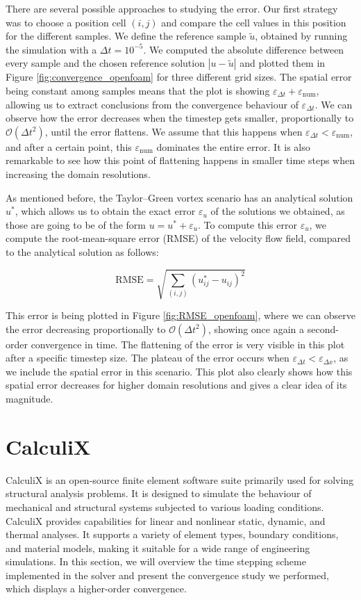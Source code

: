 \documentclass[
  english,        %
  font=times,     %
  onecolumn,      %
]{tumarticle}
\begin{document}
There are several possible approaches to studying the error. Our first strategy was to choose a position cell $(i,j)$ and compare the cell values in this position for the different samples. We define the reference sample $\tilde{u}$, obtained by running the simulation with a $\Delta t = 10^{-5}$. 
We computed the absolute difference between every sample and the chosen reference solution $|u - \tilde{u}|$ and plotted them in Figure \ref{fig:convergence_openfoam} for three different grid sizes. The spatial error being constant among samples means that the plot is showing $\varepsilon_{\Delta t} + \varepsilon_\text{num}$, allowing us to extract conclusions from the convergence behaviour of $\varepsilon_{\Delta t}$. We can observe how the error decreases when the timestep gets smaller, proportionally to $\mathcal{O}(\Delta t^2)$, until the error flattens. We assume that this happens when $\varepsilon_{\Delta t} < \varepsilon_\text{num}$, and after a certain point, this $\varepsilon_\text{num}$ dominates the entire error. It is also remarkable to see how this point of flattening happens in smaller time steps when increasing the domain resolutions.
  
As mentioned before, the Taylor–Green vortex scenario has an analytical solution $u^*$, which allows us to obtain the exact error $\varepsilon_{u}$ of the solutions we obtained, as those are going to be of the form $u = u^* + \varepsilon_{u}$. To compute this error $\varepsilon_{u}$, we compute the root-mean-square error (RMSE) of the velocity flow field, compared to the analytical solution as follows:  

\begin{equation}
    \text{RMSE} = \sqrt{\sum_{(i,j)} (u^*_{ij} - u_{ij})^2 }
\end{equation}

This error is being plotted in Figure \ref{fig:RMSE_openfoam}, where we can observe the error decreasing proportionally to $\mathcal{O}(\Delta t^2)$, showing once again a second-order convergence in time. The flattening of the error is very visible in this plot after a specific timestep size. The plateau of the error occurs when $\varepsilon_{\Delta t} < \varepsilon_{\Delta x}$, as we include the spatial error in this scenario. This plot also clearly shows how this spatial error decreases for higher domain resolutions and gives a clear idea of its magnitude. 


\section{CalculiX}\label{sec:calculix}
CalculiX is an open-source finite element software suite primarily used for solving structural analysis problems. It is designed to simulate the behaviour of mechanical and structural systems subjected to various loading conditions. CalculiX provides capabilities for linear and nonlinear static, dynamic, and thermal analyses. It supports a variety of element types, boundary conditions, and material models, making it suitable for a wide range of engineering simulations. In this section, we will overview the time stepping scheme implemented in the solver and present the convergence study we performed, which displays a higher-order convergence. 
\end{document}
